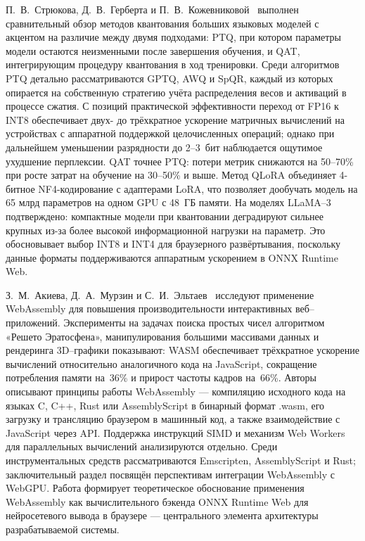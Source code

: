 П.~В.~Стрюкова, Д.~В.~Герберта и П.~В.~Кожевниковой~\cite{Stryukov2025} выполнен сравнительный обзор методов квантования больших языковых моделей с акцентом на различие между двумя подходами: PTQ, при котором параметры модели остаются неизменными после завершения обучения, и QAT, интегрирующим процедуру квантования в ход тренировки. Среди алгоритмов PTQ детально рассматриваются GPTQ, AWQ и SpQR, каждый из которых опирается на собственную стратегию учёта распределения весов и активаций в процессе сжатия. С позиций практической эффективности переход от FP16 к INT8 обеспечивает двух- до трёхкратное ускорение матричных вычислений на устройствах с аппаратной поддержкой целочисленных операций; однако при дальнейшем уменьшении разрядности до 2–3~бит наблюдается ощутимое ухудшение перплексии. QAT точнее PTQ: потери метрик снижаются на 50–70\% при росте затрат на обучение на 30–50\% и выше. Метод QLoRA объединяет 4-битное NF4-кодирование с адаптерами LoRA, что позволяет дообучать модель на 65 млрд параметров на одном GPU с 48~ГБ памяти. На моделях LLaMA–3 подтверждено: компактные модели при квантовании деградируют сильнее крупных из-за более высокой информационной нагрузки на параметр. Это обосновывает выбор INT8 и INT4 для браузерного развёртывания, поскольку данные форматы поддерживаются аппаратным ускорением в ONNX Runtime Web.

З.~М.~Акиева, Д.~А.~Мурзин и С.~И.~Эльтаев~\cite{Akieva2024} исследуют применение WebAssembly для повышения производительности интерактивных веб–приложений. Эксперименты на задачах поиска простых чисел алгоритмом «Решето Эратосфена», манипулирования большими массивами данных и рендеринга 3D–графики показывают: WASM обеспечивает трёхкратное ускорение вычислений относительно аналогичного кода на JavaScript, сокращение потребления памяти на~36\% и прирост частоты кадров на~66\%. Авторы описывают принципы работы WebAssembly — компиляцию исходного кода на языках C, C++, Rust или AssemblyScript в бинарный формат .wasm, его загрузку и трансляцию браузером в машинный код, а также взаимодействие с JavaScript через API. Поддержка инструкций SIMD и механизм Web Workers для параллельных вычислений анализируются отдельно. Среди инструментальных средств рассматриваются Emscripten, AssemblyScript и Rust; заключительный раздел посвящён перспективам интеграции WebAssembly с WebGPU. Работа формирует теоретическое обоснование применения WebAssembly как вычислительного бэкенда ONNX Runtime Web для нейросетевого вывода в браузере — центрального элемента архитектуры разрабатываемой системы.

